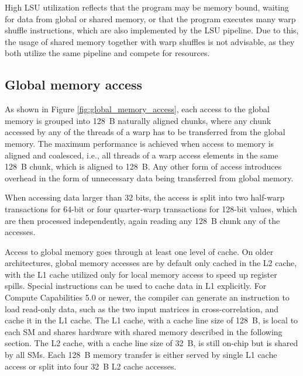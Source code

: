 High LSU utilization reflects that the program may be memory bound, waiting for data from global or shared memory, or that the program executes many warp shuffle instructions, which are also implemented by the LSU pipeline. Due to this, the usage of shared memory together with warp shuffles is not advisable, as they both utilize the same pipeline and compete for resources.


\subsection{Global memory access}
\label{sec:global_memory_access}

As shown in Figure \ref{fig:global_memory_access}, each access to the global memory is grouped into 128~B naturally aligned chunks, where any chunk accessed by any of the threads of a warp has to be transferred from the global memory. The maximum performance is achieved when access to memory is aligned and coalesced, i.e., all threads of a warp access elements in the same 128~B chunk, which is aligned to 128~B. Any other form of access introduces overhead in the form of unnecessary data being transferred from global memory. 

When accessing data larger than 32 bits, the access is split into two half-warp transactions for 64-bit or four quarter-warp transactions for 128-bit values, which are then processed independently, again reading any 128~B chunk any of the accesses. 

Access to global memory goes through at least one level of cache. On older architectures, global memory accesses are by default only cached in the L2 cache, with the L1 cache utilized only for local memory access to speed up register spills. %
Special instructions can be used to cache data in L1 explicitly. For Compute Capabilities 5.0 or newer, the compiler can generate an instruction to load read-only data, such as the two input matrices in cross-correlation, and cache it in the L1 cache. The L1 cache, with a cache line size of 128~B, is local to each SM and shares hardware with shared memory described in the following section. The L2 cache, with a cache line size of 32~B, is still on-chip but is shared by all SMs. Each 128~B memory transfer is either served by single L1 cache access or split into four 32~B L2 cache accesses.

